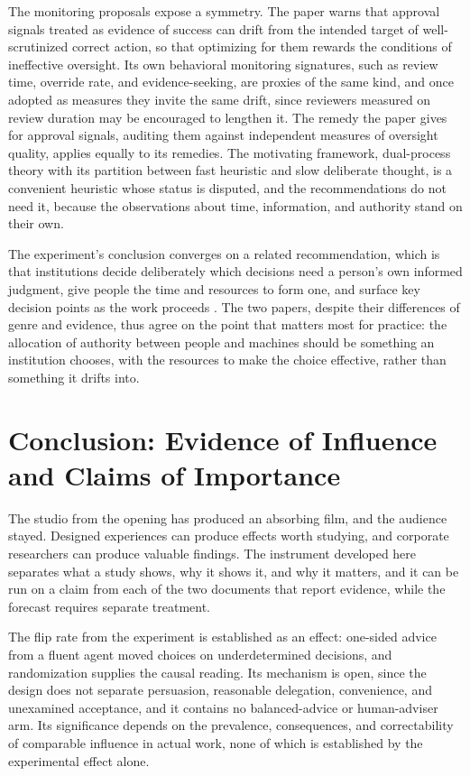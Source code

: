 \documentclass[11pt]{article}
\begin{document}
The monitoring proposals expose a symmetry. The paper warns that approval signals treated as evidence of success can drift from the intended target of well-scrutinized correct action, so that optimizing for them rewards the conditions of ineffective oversight. Its own behavioral monitoring signatures, such as review time, override rate, and evidence-seeking, are proxies of the same kind, and once adopted as measures they invite the same drift, since reviewers measured on review duration may be encouraged to lengthen it. The remedy the paper gives for approval signals, auditing them against independent measures of oversight quality, applies equally to its remedies. The motivating framework, dual-process theory with its partition between fast heuristic and slow deliberate thought, is a convenient heuristic whose status is disputed, and the recommendations do not need it, because the observations about time, information, and authority stand on their own.

The experiment's conclusion converges on a related recommendation, which is that institutions decide deliberately which decisions need a person's own informed judgment, give people the time and resources to form one, and surface key decision points as the work proceeds \cite{herdagdelen}. The two papers, despite their differences of genre and evidence, thus agree on the point that matters most for practice: the allocation of authority between people and machines should be something an institution chooses, with the resources to make the choice effective, rather than something it drifts into.

\section{Conclusion: Evidence of Influence and Claims of Importance}

The studio from the opening has produced an absorbing film, and the audience stayed. Designed experiences can produce effects worth studying, and corporate researchers can produce valuable findings. The instrument developed here separates what a study shows, why it shows it, and why it matters, and it can be run on a claim from each of the two documents that report evidence, while the forecast requires separate treatment.

The flip rate from the experiment is established as an effect: one-sided advice from a fluent agent moved choices on underdetermined decisions, and randomization supplies the causal reading. Its mechanism is open, since the design does not separate persuasion, reasonable delegation, convenience, and unexamined acceptance, and it contains no balanced-advice or human-adviser arm. Its significance depends on the prevalence, consequences, and correctability of comparable influence in actual work, none of which is established by the experimental effect alone.
\end{document}
